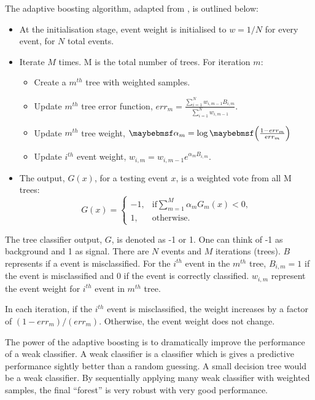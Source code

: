 The adaptive boosting algorithm, adapted from \cite{hastie2009elements},  is outlined below:

\begin{itemize}
  \item At the initialisation stage,  event weight is initialised to $w = 1 / N$ for every event, for $N$ total events.
  \item Iterate $M$ times. M is the total number of trees. For iteration $m$:
    \begin{itemize}
      \item Create a $m^{th}$ tree  with weighted samples.
      \item Update $m^{th}$ tree error function, $err_m = \frac{\sum_{i = 1}^{N} w_{i,m-1} B_{i,m} }{\sum_{i = 1}^{N}w_{i,m-1}}$.
      \item Update $m^{th}$ tree weight,  $\alpha_m = \log\parenths{\frac{1 - err_m}{err_m}}$
      \item Update $i^{th}$ event weight, $w_{i,m} = w_{i,m-1} e^{\alpha_m B_{i,m} }$.
    \end{itemize}
  \item The output, $G(x)$, for a testing event $x$, is a weighted vote from all M trees:
  \begin{equation}
    G(x)=
     \begin{cases}
      -1, & \mbox{if} \sum_{m=1}^{M}\alpha_mG_m(x) < 0 , \\
      1, & \mbox{otherwise}.
    \end{cases}
  \end{equation}
\end{itemize}
The tree classifier output, $G$, is denoted as  -1 or 1. One can think of -1 as background and 1 as signal. There are $N$ events and $M$ iterations (trees). $B$ represents if a event is misclassified. For the $i^{th}$ event in the  $m^{th}$ tree,  $B_{i,m} = 1$ if the event is misclassified and 0 if the event is correctly classified. $w_{i,m}$ represent the event weight for $i^{th}$ event  in $m^{th}$ tree.


In each iteration, if the $i^{th}$ event is misclassified, the weight increases by a factor of $(1 - err_m)/(err_m)$. Otherwise, the event weight does not change.

The power of the adaptive boosting  is to dramatically improve the performance of a weak classifier. A weak classifier is a classifier which is gives a predictive performance sightly better than a random guessing. A small decision tree would be a weak classifier. By sequentially applying many weak classifier with weighted samples, the final ``forest'' is very robust with very good performance.

